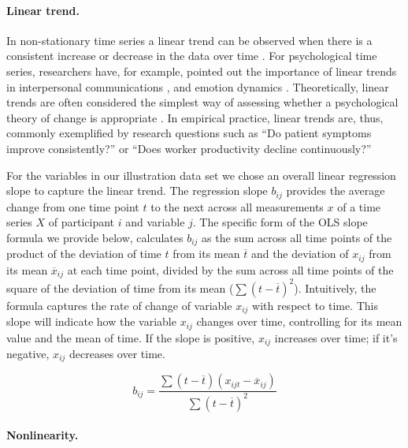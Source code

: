 \paragraph{Linear trend.}

In non-stationary time series a linear trend can be observed when there
is a consistent increase or decrease in the data over time
\citep{nyblom1986}. For psychological time series, researchers have, for
example, pointed out the importance of linear trends in interpersonal
communications \citep{vasileiadou2014}, and emotion dynamics
\citep{oravecz2016}. Theoretically, linear trends are often considered
the simplest way of assessing whether a psychological theory of change
is appropriate \citep{gottman1969}. In empirical practice, linear trends
are, thus, commonly exemplified by research questions such as ``Do
patient symptoms improve consistently?'' or ``Does worker productivity
decline continuously?''

For the variables in our illustration data set we chose an overall
linear regression slope to capture the linear trend. The regression
slope \(b_{ij}\) provides the average change from one time point \(t\)
to the next across all measurements \(x\) of a time series \(X\) of
participant \(i\) and variable \(j\). The specific form of the OLS slope
formula we provide below, calculates \(b_{ij}\) as the sum across all
time points of the product of the deviation of time \(t\) from its mean
\(\overline{t}\) and the deviation of \(x_{ij}\) from its mean
\(\overline{x}_{ij}\) at each time point, divided by the sum across all
time points of the square of the deviation of time from its mean
(\(\sum(t-\overline{t})^2\)). Intuitively, the formula captures the rate
of change of variable \(x_{ij}\) with respect to time. This slope will
indicate how the variable \(x_{ij}\) changes over time, controlling for
its mean value and the mean of time. If the slope is positive,
\(x_{ij}\) increases over time; if it's negative, \(x_{ij}\) decreases
over time.

\begin{equation} \label{eq:lin}
  b_{ij} = \frac{\sum(t-\overline{t})(x_{ijt}-\overline{x}_{ij})}{\sum(t-\overline{t})^2}
\end{equation}

\paragraph{Nonlinearity.}

